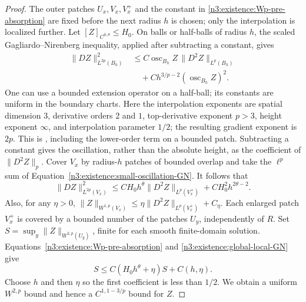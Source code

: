 \begin{proof}
The outer patches $U_x,V_x,V_x^+$ and the constant in
\eqref{n3:existence:Wp-pre-absorption} are fixed before the next radius
$h$ is chosen; only the interpolation is localized further.
Let $[Z]_{C^{0,\theta}}\le H_0$. On balls or half-balls of
radius $h$, the scaled Gagliardo--Nirenberg inequality, applied after
subtracting a constant, gives
\begin{equation}\label{n3:existence:small-oscillation-GN}
 \begin{split}
 \|DZ\|_{L^{2p}(B_h)}^2
 &\le C\operatorname{osc}_{B_h}Z\,
                    \|D^2Z\|_{L^p(B_h)}\\
 &\quad+Ch^{3/p-2}(\operatorname{osc}_{B_h}Z)^2.
 \end{split}
\end{equation}
One can use a bounded extension operator on a half-ball; its constants
are uniform in the boundary charts.  Here the interpolation exponents are spatial dimension $3$,
derivative orders $2$ and $1$, top-derivative exponent $p>3$,
height exponent $\infty$, and interpolation parameter $1/2$;
the resulting gradient exponent is $2p$. This is
\cite[Lecture~II, Equation~(2.2), p.~125, and Remark~5, p.~126]{Nirenberg1959},
including the lower-order term on a bounded patch. Subtracting a
constant gives the oscillation, rather than the absolute height,
as the coefficient of $\|D^2Z\|_p$.
Cover $V_x$ by radius-$h$ patches of bounded overlap and take the
$\ell^p$ sum of Equation~\eqref{n3:existence:small-oscillation-GN}.
It follows that
\begin{equation}\label{n3:existence:global-local-GN}
 \|DZ\|_{L^{2p}(V_x)}^2
 \le CH_0h^\theta\|D^2Z\|_{L^p(V_x^+)}
           +CH_0^2h^{2\theta-2}.
\end{equation}
Also, for any $\eta>0$,
$\|Z\|_{W^{1,p}(V_x)}
 \le\eta\|D^2Z\|_{L^p(V_x^+)}+C_\eta$.
Each enlarged patch $V_x^+$ is covered by a bounded number of the
patches $U_y$, independently of $R$.  Set
$S=\sup_y\|Z\|_{W^{2,p}(U_y)}$, finite for each smooth finite-domain
solution.  Equations~\eqref{n3:existence:Wp-pre-absorption} and
\eqref{n3:existence:global-local-GN} give
\begin{equation}\label{n3:existence:uniform-local-absorption}
 S\le C(H_0h^\theta+\eta)S+C(h,\eta).
\end{equation}
Choose $h$ and then $\eta$ so the first coefficient is less than
$1/2$.  We obtain a uniform $W^{2,p}$ bound and hence a
$C^{1,1-3/p}$ bound for $Z$.


\end{proof}
